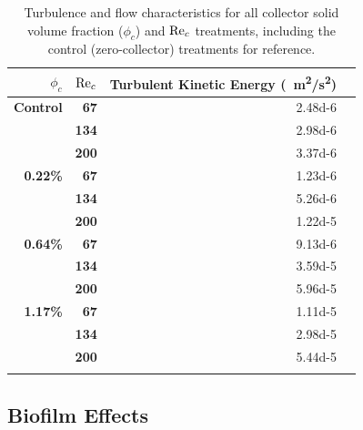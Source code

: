 \documentclass[geosciences,article,submit,moreauthors,pdftex]{Definitions/mdpi}
\begin{document}
\begin{table}[H]
\caption{Turbulence and flow characteristics for all collector solid volume fraction ($\phi_c$) and $\mathrm{Re}_c$ treatments, including the control (zero-collector) treatments for reference.}
\centering
\begin{tabular}{>{\bfseries}r>{\bfseries}rrr}
\toprule
\textbf{$\phi_c$}&\textbf{$\mathrm{Re}_c$}&\textbf{Turbulent Kinetic Energy (\SI{}{\metre^2/\second^2})}\\
\midrule
Control &   67  & \num{2.48d-6}\\
        &   134 & \num{2.98d-6}\\
        &   200 & \num{3.37d-6}\\
\midrule
0.22\% &   67  & \num{1.23d-6}\\
        &   134 & \num{5.26d-6}\\
        &   200 & \num{1.22d-5}\\
\midrule
0.64\% &   67  & \num{9.13d-6}\\
        &   134 & \num{3.59d-5}\\
        &   200 & \num{5.96d-5}\\
\midrule
1.17\%  &   67  & \num{1.11d-5}\\
        &   134 & \num{2.98d-5}\\
        &   200 & \num{5.44d-5}\\
\bottomrule
\label{tbl:turbulence}
\end{tabular}
\end{table}


\subsection{Biofilm Effects}
\end{document}
